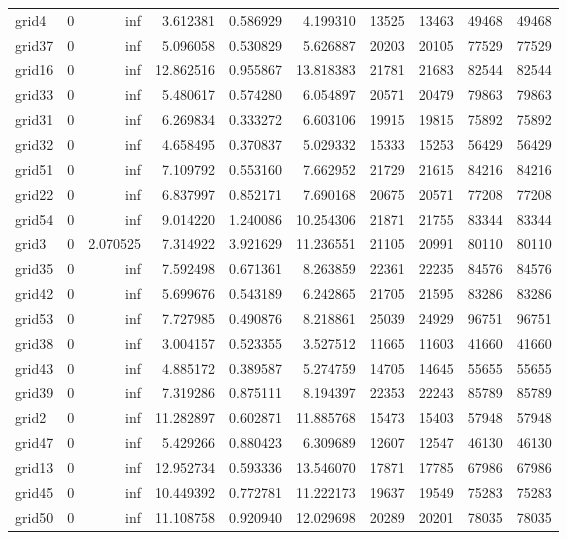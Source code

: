 \begin{longtable}{|l|r|r|r|r|r|r|r|r|r|}
grid4 & 0 & inf & 3.612381 & 0.586929 & 4.199310 & 13525 & 13463 & 49468 & 49468 \\
grid37 & 0 & inf & 5.096058 & 0.530829 & 5.626887 & 20203 & 20105 & 77529 & 77529 \\
grid16 & 0 & inf & 12.862516 & 0.955867 & 13.818383 & 21781 & 21683 & 82544 & 82544 \\
grid33 & 0 & inf & 5.480617 & 0.574280 & 6.054897 & 20571 & 20479 & 79863 & 79863 \\
grid31 & 0 & inf & 6.269834 & 0.333272 & 6.603106 & 19915 & 19815 & 75892 & 75892 \\
grid32 & 0 & inf & 4.658495 & 0.370837 & 5.029332 & 15333 & 15253 & 56429 & 56429 \\
grid51 & 0 & inf & 7.109792 & 0.553160 & 7.662952 & 21729 & 21615 & 84216 & 84216 \\
grid22 & 0 & inf & 6.837997 & 0.852171 & 7.690168 & 20675 & 20571 & 77208 & 77208 \\
grid54 & 0 & inf & 9.014220 & 1.240086 & 10.254306 & 21871 & 21755 & 83344 & 83344 \\
grid3 & 0 & 2.070525 & 7.314922 & 3.921629 & 11.236551 & 21105 & 20991 & 80110 & 80110 \\
grid35 & 0 & inf & 7.592498 & 0.671361 & 8.263859 & 22361 & 22235 & 84576 & 84576 \\
grid42 & 0 & inf & 5.699676 & 0.543189 & 6.242865 & 21705 & 21595 & 83286 & 83286 \\
grid53 & 0 & inf & 7.727985 & 0.490876 & 8.218861 & 25039 & 24929 & 96751 & 96751 \\
grid38 & 0 & inf & 3.004157 & 0.523355 & 3.527512 & 11665 & 11603 & 41660 & 41660 \\
grid43 & 0 & inf & 4.885172 & 0.389587 & 5.274759 & 14705 & 14645 & 55655 & 55655 \\
grid39 & 0 & inf & 7.319286 & 0.875111 & 8.194397 & 22353 & 22243 & 85789 & 85789 \\
grid2 & 0 & inf & 11.282897 & 0.602871 & 11.885768 & 15473 & 15403 & 57948 & 57948 \\
grid47 & 0 & inf & 5.429266 & 0.880423 & 6.309689 & 12607 & 12547 & 46130 & 46130 \\
grid13 & 0 & inf & 12.952734 & 0.593336 & 13.546070 & 17871 & 17785 & 67986 & 67986 \\
grid45 & 0 & inf & 10.449392 & 0.772781 & 11.222173 & 19637 & 19549 & 75283 & 75283 \\
grid50 & 0 & inf & 11.108758 & 0.920940 & 12.029698 & 20289 & 20201 & 78035 & 78035 \\

\end{longtable}
